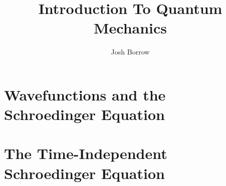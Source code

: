 \documentclass[11pt]{report}
\begin{document}
\title{Introduction To Quantum Mechanics}
\author{Josh Borrow}

\maketitle

\chapter{Wavefunctions and the Schroedinger Equation}





\chapter{The Time-Independent Schroedinger Equation}


\end{document}
